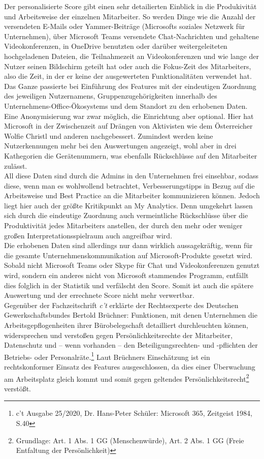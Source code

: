 Der personalisierte Score gibt einen sehr detailierten Einblick in die Produkivität und Arbeitsweise der einzelnen Mitarbeiter. So werden Dinge wie die Anzahl der versendeten E-Mails oder Yammer-Beiträge (Microsofts soziales Netzwerk für Unternehmen), über Microsoft Teams versendete Chat-Nachrichten und gehaltene Videokonferenzen, in OneDrive benutzten oder darüber weitergeleiteten hochgeladenen Dateien, die Teilnahmezeit an Videokonferenzen und wie lange der Nutzer seinen Bildschirm geteilt hat oder auch die \glqq Fokus-Zeit\grqq{} des Mitarbeiters, also die Zeit, in der er keine der ausgewerteten Funktionalitäten verwendet hat. Das Ganze passierte bei Einführung des Features mit der eindeutigen Zuordnung des jeweiligen Nutzernamens, Gruppenzugehörigkeiten innerhalb des Unternehmens-Office-Ökosystems und dem Standort zu den erhobenen Daten. Eine Anonymisierung war zwar möglich, die Einrichtung aber optional. Hier hat Microsoft in der Zwischenzeit auf Drängen von Aktivisten wie dem Österreicher Wolfie Christl und anderen nachgebessert. Zumindest werden keine Nutzerkennungen mehr bei den Auswertungen angezeigt, wohl aber in drei Kathegorien die Gerätenummern, was ebenfalls Rückschlüsse auf den Mitarbeiter zulässt.\\

All diese Daten sind durch die Admins in den Unternehmen frei einsehbar, sodass diese, wenn man es wohlwollend betrachtet, Verbesserungstipps in Bezug auf die Arbeitsweise und Best Practice an die Mitarbeiter kommunizieren können. Jedoch liegt hier auch der größte Kritikpunkt an My Analytics. Denn umgekehrt lassen sich durch die eindeutige Zuordnung auch vermeintliche Rückschlüsse über die Produktivität jedes Mitarbeiters anstellen, der durch den mehr oder weniger großen Interpretationsspielraum auch angreifbar wird.\\
Die erhobenen Daten sind allerdings nur dann wirklich aussagekräftig, wenn für die gesamte Unternehmenskommunikation auf Microsoft-Produkte gesetzt wird. Sobald nicht Microsoft Teams oder Skype für Chat und Videokonferenzen genutzt wird, sondern ein anderes nicht von Microsoft stammendes Programm, entfällt dies folglich in der Statistik und verfälscht den Score. Somit ist auch die spätere Auswertung und der errechnete Score nicht mehr verwertbar.\\

Gegenüber der Fachzeitschrift \textit{c't} erklärte der Rechtsexperte des Deutschen Gewerkschaftsbundes Bertold Brüchner: \glqq Funktionen, mit denen Unternehmen die Arbeitsgepflogenheiten ihrer Bürobelegschaft detailliert durchleuchten können, widersprechen und verstoßen gegen Persönlichkeitsrechte der Mitarbeiter, Datenschutz und – wenn vorhanden – den Beteiligungsrechten- und -pflichten der Betriebs- oder Personalräte.\grqq{}\footnote{c't Ausgabe 25/2020, Dr. Hans-Peter Schüler: \glqq Microsoft 365, Zeitgeist 1984\grqq{}, S.40} Laut Brüchners Einschätzung ist ein rechtskonformer Einsatz des Features ausgeschlossen, da dies einer Überwachung am Arbeitsplatz gleich kommt und somit gegen geltendes Persönlichkeitsrecht\footnote{Grundlage: Art. 1 Abs. 1 GG (Menschenwürde), Art. 2 Abs. 1 GG (Freie Entfaltung der Persönlichkeit)} verstößt.\\

\vfill